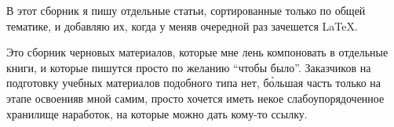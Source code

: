 
В этот сборник я пишу отдельные статьи, сортированные только по общей тематике,
и добавляю их, когда у меняв очередной раз зачешется \LaTeX.

Это сборник черновых материалов, которые мне лень компоновать в отдельные
книги, и которые пишутся просто по желанию ``чтобы было''. Заказчиков на
подготовку учебных материалов подобного типа нет, б\`{о}льшая часть только на
этапе освоенияв мной самим, просто хочется иметь некое
слабоупорядоченное хранилище наработок, на которые можно дать кому-то ссылку.
